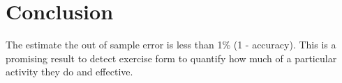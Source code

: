 \documentclass[]{article}
\begin{document}
\section{Conclusion}\label{conclusion}

The estimate the out of sample error is less than 1\% (1 - accuracy).
This is a promising result to detect exercise form to quantify how much
of a particular activity they do and effective.
\end{document}
